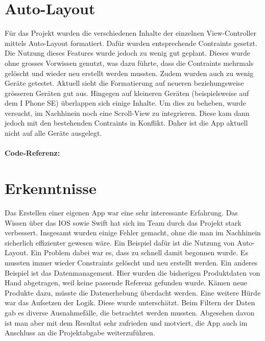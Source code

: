 \documentclass[12pt,titlepage]{article}
\begin{document}
\section*{Auto-Layout}
Für das Projekt wurden die verschiedenen Inhalte der einzelnen View-Controller mittels Auto-Layout formatiert. Dafür wurden entsprechende Contraints gesetzt. Die Nutzung dieses Features wurde jedoch zu wenig gut geplant. Dieses wurde ohne grosses Vorwissen genutzt, was dazu führte, dass die Contraints mehrmals gelöscht und wieder neu erstellt werden mussten. Zudem wurden auch zu wenig Geräte getestet. Aktuell sieht die Formatierung auf neueren beziehungsweise grösseren Geräten gut aus. Hingegen auf kleineren Geräten (beispielsweise auf dem I Phone SE) überlappen sich einige Inhalte. Um dies zu beheben, wurde versucht, im Nachhinein noch eine Scroll-View zu integrieren. Diese kam dann jedoch mit den bestehenden Contraints in Konflikt. Daher ist die App aktuell nicht auf alle Geräte ausgelegt.\\
\\
\textbf{Code-Referenz: }\\ 

\section*{Erkenntnisse}
Das Erstellen einer eigenen App war eine sehr interessante Erfahrung. Das Wissen über das IOS sowie Swift hat sich im Team durch das Projekt stark verbessert. Insgesamt wurden einige Fehler gemacht, ohne die man im Nachhinein sicherlich effizienter gewesen wäre. Ein Beispiel dafür ist die Nutzung von Auto-Layout. Ein Problem dabei war es, dass zu schnell damit begonnen wurde. Es mussten immer wieder Constraints gelöscht und neu erstellt werden. Ein anderes Beispiel ist das Datenmanagement. Hier wurden die bisherigen Produktdaten von Hand abgetragen, weil keine passende Referenz gefunden wurde. Kämen neue Produkte dazu, müsste die Datenerhebung überdacht werden. Eine weitere Hürde war das Aufsetzen der Logik. Diese wurde unterschätzt. Beim Filtern der Daten gab es diverse Ausnahmefälle, die betrachtet werden mussten. Abgesehen davon ist man aber mit dem Resultat sehr zufrieden und motviert, die App auch im Anschluss an die Projektabgabe weiterzuführen.
\end{document}

